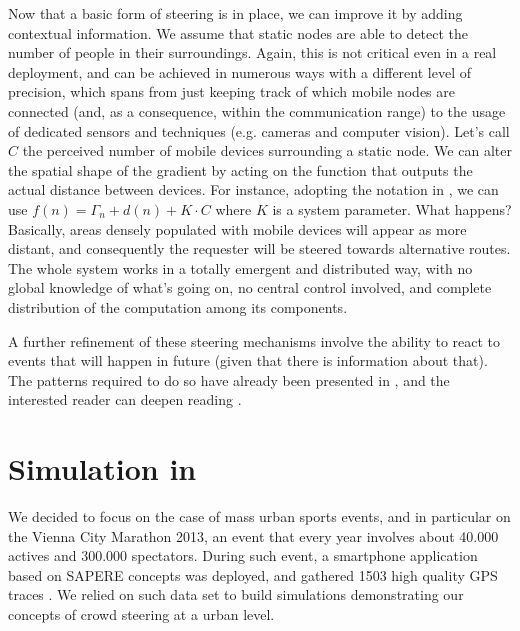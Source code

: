 \documentclass[12pt,a4paper,twoside,openright]{book}
\begin{document}
Now that a basic form of steering is in place, we can improve it by adding contextual information.
%
We assume that static nodes are able to detect the number of people in their surroundings.
%
Again, this is not critical even in a real deployment, and can be achieved in numerous ways with a different level of precision, which spans from just keeping track of which mobile nodes are connected (and, as a consequence, within the communication range) to the usage of dedicated sensors and techniques (e.g. cameras and computer vision).
%
Let's call $C$ the perceived number of mobile devices surrounding a static node.
%
We can alter the spatial shape of the gradient by acting on the function that outputs the actual distance between devices.
%
For instance, adopting the notation in , we can use $f(n) = \varGamma_{n} +d(n) + K \cdot{} C$ where $K$ is a system parameter.
%
What happens? Basically, areas densely populated with mobile devices will appear as more distant, and consequently the requester will be steered towards alternative routes.
%
The whole system works in a totally emergent and distributed way, with no global knowledge of what's going on, no central control involved, and complete distribution of the computation among its components.

A further refinement of these steering mechanisms involve the ability to react to events that will happen in future (given that there is information about that).
%
The patterns required to do so have already been presented in , and the interested reader can deepen reading \cite{anticipativegradient-SASO12}.

\section{Simulation in \alchemist{}}
\label{ahpc-simulation}
We decided to focus on the case of mass urban sports events, and in particular on the Vienna City Marathon 2013, an event that every year involves about 40.000 actives and 300.000 spectators.
%
During such event, a smartphone application based on SAPERE \cite{sapere-procedia7} concepts was deployed, and gathered 1503 high quality GPS traces \cite{socinfo2013}.
%
We relied on such data set to build simulations demonstrating our concepts of crowd steering at a urban level.
\end{document}
